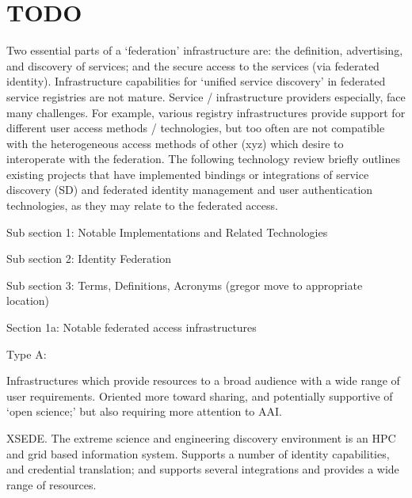 \section{TODO}



Two essential parts of a ‘federation’ infrastructure are: the
definition, advertising, and discovery of services; and the secure
access to the services (via federated identity).  Infrastructure
capabilities for ‘unified service discovery’ in federated service
registries are not mature. Service / infrastructure providers
especially, face many challenges. For example, various registry
infrastructures provide support for different user access methods /
technologies, but too often are not compatible with the heterogeneous
access methods of other (xyz) which desire to interoperate with the
federation.  The following technology review briefly outlines existing
projects that have implemented bindings or integrations of service
discovery (SD) and federated identity management and user
authentication technologies, as they may relate to the federated
access.

Sub section 1: 	Notable Implementations and Related Technologies

Sub section 2:	Identity Federation

Sub section 3: 	Terms, Definitions, Acronyms ({gregor} move to appropriate location)

Section 1a: Notable federated access infrastructures 

Type A: 

Infrastructures which provide resources to a broad audience with a
wide range of user requirements. Oriented more toward sharing, and
potentially supportive of ‘open science;’ but also requiring more
attention to AAI.

XSEDE.
The extreme science and engineering discovery environment is an
HPC and grid based information system. Supports a number of identity
capabilities, and credential translation; and supports several
integrations and provides a wide range of resources.

